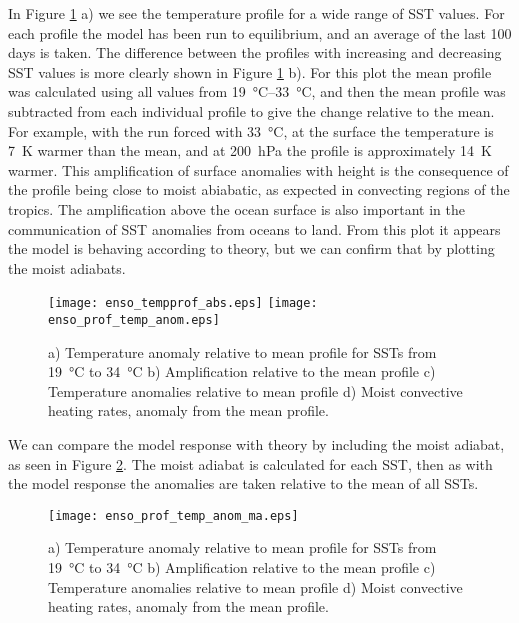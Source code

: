 In Figure \ref{fig:scmsstprof_large} a) we see the temperature profile for a 
wide range of SST values. For each profile the model has been run to 
equilibrium, and an average of the last 100 days is taken. The difference 
between the profiles with increasing and decreasing SST values is more clearly 
shown in Figure \ref{fig:scmsstprof_large} b). For this plot the mean profile 
was calculated using all values from \SIrange{19}{33}{\degreeCelsius}, and then 
the mean profile was subtracted from each individual profile to give the change 
relative to the mean. For example, with the run forced with 
\SI{33}{\degreeCelsius}, at the surface the temperature is \SI{7}{\kelvin} 
warmer than the mean, and at \SI{200}{\hecto\pascal} the profile is 
approximately \SI{14}{\kelvin} warmer. This amplification of surface anomalies 
with height is the consequence of the profile being close to moist abiabatic, as 
expected in convecting regions of the tropics. The amplification above the ocean 
surface is also important in the communication of SST anomalies from oceans to 
land. From this plot it appears the model is behaving according to theory, but 
we can confirm that by plotting the moist adiabats.

\begin{figure}[ht]
\texttt{[image: enso\_tempprof\_abs.eps]}
\texttt{[image: enso\_prof\_temp\_anom.eps]}
\caption{a) Temperature anomaly relative to mean profile for SSTs from 
\SI{19}{\degreeCelsius} to \SI{34}{\degreeCelsius} b) Amplification relative to 
the mean profile c) Temperature anomalies relative to mean profile d) Moist 
convective heating rates, anomaly from the mean profile.}
\label{fig:scmsstprof_large}
\end{figure}

We can compare the model response with theory by including the moist adiabat, as 
seen in Figure \ref{fig:scmsstprof_ma}. The moist adiabat is calculated for each 
SST, then as with the model response the anomalies are taken relative to the 
mean of all SSTs. 

\begin{figure}[ht]
\texttt{[image: enso\_prof\_temp\_anom\_ma.eps]}
\caption{a) Temperature anomaly relative to mean profile for SSTs from 
\SI{19}{\degreeCelsius} to \SI{34}{\degreeCelsius} b) Amplification relative to 
the mean profile c) Temperature anomalies relative to mean profile d) Moist 
convective heating rates, anomaly from the mean profile.}
\label{fig:scmsstprof_ma}
\end{figure}

